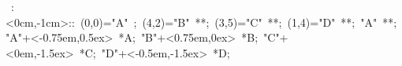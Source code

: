 
\hbox{
\xy    <1cm,0cm>:<0cm,-1cm>::
       (0,0)="A" ; (4,2)="B" **\dir{-};
       (3,5)="C" **\dir{-}; (1,4)="D" **\dir{-}; "A"  **\dir{-};  
       "A"+<-0.75em,0.5ex> *{A};
       "B"+<0.75em,0ex> *{B};
       "C"+<0em,-1.5ex> *{C};
       "D"+<-0.5em,-1.5ex> *{D};
       \endxy}
	   
